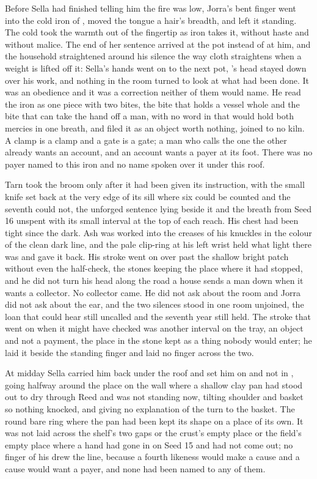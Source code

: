 Before Sella had finished telling him the fire was low, Jorra's bent finger went into the cold iron of , moved the tongue a hair's breadth, and left it standing. The cold took the warmth out of the fingertip as iron takes it, without haste and without malice. The end of her sentence arrived at the pot instead of at him, and the household straightened around his silence the way cloth straightens when a weight is lifted off it: Sella's hands went on to the next pot, 's head stayed down over his work, and nothing in the room turned to look at what had been done. It was an obedience and it was a correction neither of them would name. He read the iron as one piece with two bites, the bite that holds a vessel whole and the bite that can take the hand off a man, with no word in  that would hold both mercies in one breath, and filed it as an object worth nothing, joined to no kiln. A clamp is a clamp and a gate is a gate; a man who calls the one the other already wants an account, and an account wants a payer at its foot. There was no payer named to this iron and no name spoken over it under this roof.

Tarn took the broom only after it had been given its instruction, with the small knife set back at the very edge of its sill where six could be counted and the seventh could not, the unforged sentence lying beside it and the breath from Seed 16 unspent with its small interval at the top of each reach. His chest had been tight since the dark. Ash was worked into the creases of his knuckles in the colour of the clean dark line, and the pale clip-ring at his left wrist held what light there was and gave it back. His stroke went on over  past the shallow bright patch without even the half-check, the stones keeping the place where it had stopped, and he did not turn his head along the road a house sends a man down when it wants a collector. No collector came. He did not ask about the room and Jorra did not ask about the ear, and the two silences stood in one room unjoined, the loan that could hear still uncalled and the seventh year still held. The stroke that went on when it might have checked was another interval on the tray, an object and not a payment, the place in the stone kept as a thing nobody would enter; he laid it beside the standing finger and laid no finger across the two.

\scenebreak

At midday Sella carried him back under the roof and set him on  and not in , going halfway around the place on the wall where a shallow clay pan had stood out to dry through Reed and was not standing now, tilting shoulder and basket so nothing knocked, and giving no explanation of the turn to the basket. The round bare ring where the pan had been kept its shape on a place of its own. It was not laid across the shelf's two gaps or the crust's empty place or the field's empty place where a hand had gone in on Seed 15 and had not come out; no finger of his drew the line, because a fourth likeness would make a cause and a cause would want a payer, and none had been named to any of them.

